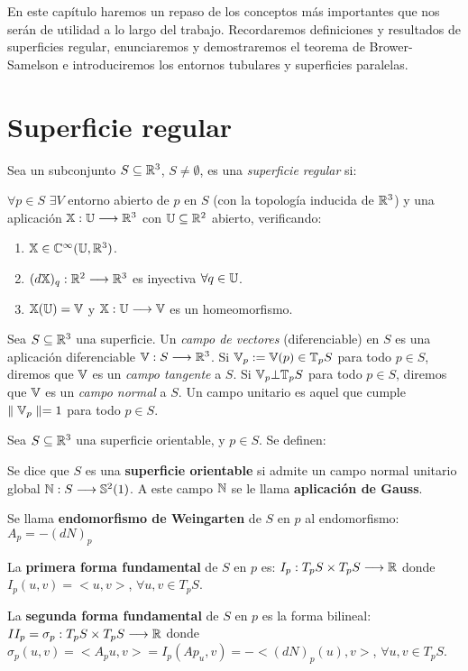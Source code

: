 En este capítulo haremos un repaso de los conceptos más importantes que nos serán de utilidad a lo largo del trabajo. Recordaremos definiciones y resultados de superficies regular, enunciaremos y demostraremos el teorema de Brower-Samelson e introduciremos los entornos tubulares y superficies paralelas.

\section{Superficie regular}

\begin{definition}
Sea un subconjunto $S \subseteq \mathbb{R}^3$, $S \neq \emptyset$, es una \textit{superficie regular} si:

$\forall p \in S$ $\exists V$ entorno abierto de $p$ en $S$ (con la topología inducida de $\mathbb{R}^3$) y una aplicación $\mathbb{X}: \mathbb{U} \longrightarrow \mathbb{R}^3$ con $\mathbb{U} \subseteq \mathbb{R}^2$ abierto, verificando:

\begin{enumerate}
    \item $\mathbb{X} \in \mathbb{C}^\infty(\mathbb{U}, \mathbb{R}^3)$.
    \item $(d\mathbb{X})_{q}: \mathbb{R}^2 \longrightarrow \mathbb{R}^3$ es inyectiva $\forall q \in \mathbb{U}$.
    \item $\mathbb{X}(\mathbb{U}) = \mathbb{V}$ y $\mathbb{X}:\mathbb{U} \longrightarrow \mathbb{V}$ es un homeomorfismo.
\end{enumerate}
\end{definition}

Sea $S \subseteq \mathbb{R}^3$ una superficie. Un \textit{campo de vectores} (diferenciable) en $S$ es una aplicación diferenciable $\mathbb{V}: S \longrightarrow \mathbb{R}^3$. Si $\mathbb{V}_p := \mathbb{V}(p) \in \mathbb{T}_p S$ para todo $p \in S$, diremos que $\mathbb{V}$ es un \textit{campo tangente} a $S$. Si $\mathbb{V}_p \bot \mathbb{T}_p S$ para todo $p \in S$, diremos que $\mathbb{V}$ es un \textit{campo normal} a $S$. Un campo unitario es aquel que cumple $\parallel \mathbb{V}_p \parallel = 1$ para todo $p \in S$.

Sea $S \subseteq \mathbb{R}^3$ una superficie orientable, y $p \in S$. Se definen:

Se dice que $S$ es una \textbf{superficie orientable} si admite un campo normal unitario global $\mathbb{N}: S \longrightarrow \mathbb{S}^2(1)$. A este campo $\mathbb{N}$ se le llama \textbf{aplicación de Gauss}.

Se llama \textbf{endomorfismo de Weingarten} de $S$ en $p$ al endomorfismo: $A_p = -(dN)_p$

\begin{definition}
La \textbf{primera forma fundamental} de $S$ en $p$ es: $I_p: T_pS \times T_pS \longrightarrow \mathbb{R}$ donde $I_p(u,v) = <u,v>$, $\forall u,v \in T_pS$.

La \textbf{segunda forma fundamental} de $S$ en $p$ es la forma bilineal: $II_p = \sigma_p: T_pS \times T_pS \longrightarrow \mathbb{R}$ donde $\sigma_p(u,v) = <A_pu,v> = I_p(Ap_u,v) = -<(dN)_p(u), v>$, $\forall u,v \in T_pS$.
\end{definition}

